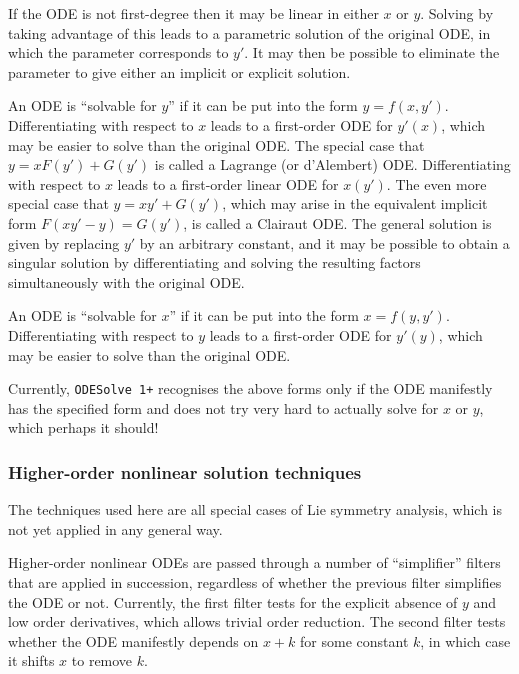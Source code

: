 \documentclass[a4paper]{article} %
\newcommand{\ODESolve}[1]{\texttt{ODESolve\,#1}}
\begin{document}
If the ODE is not first-degree then it may be linear in either $x$ or
$y$.  Solving by taking advantage of this leads to a parametric
solution of the original ODE, in which the parameter corresponds to
$y'$.  It may then be possible to eliminate the parameter to give
either an implicit or explicit solution.

An ODE is ``solvable for $y$'' if it can be put into the form $y =
f(x,y')$.  Differentiating with respect to $x$ leads to a first-order
ODE for $y'(x)$, which may be easier to solve than the original ODE.
The special case that $y = xF(y') + G(y')$ is called a Lagrange (or
d'Alembert) ODE\@.  Differentiating with respect to $x$ leads to a
first-order linear ODE for $x(y')$.  The even more special case that
$y = x y' + G(y')$, which may arise in the equivalent implicit form
$F(xy'-y) = G(y')$, is called a Clairaut ODE\@.  The general solution is
given by replacing $y'$ by an arbitrary constant, and it may be
possible to obtain a singular solution by differentiating and solving
the resulting factors simultaneously with the original ODE.

An ODE is ``solvable for $x$'' if it can be put into the form $x =
f(y,y')$.  Differentiating with respect to $y$ leads to a first-order
ODE for $y'(y)$, which may be easier to solve than the original ODE.

Currently, \ODESolve{1+} recognises the above forms only if the ODE
manifestly has the specified form and does not try very hard to
actually solve for $x$ or $y$, which perhaps it should!


\subsubsection{Higher-order nonlinear solution techniques}

The techniques used here are all special cases of Lie symmetry
analysis, which is not yet applied in any general way.

Higher-order nonlinear ODEs are passed through a number of
``simplifier'' filters that are applied in succession, regardless of
whether the previous filter simplifies the ODE or not.  Currently, the
first filter tests for the explicit absence of $y$ and low order
derivatives, which allows trivial order reduction.  The second filter
tests whether the ODE manifestly depends on $x+k$ for some constant
$k$, in which case it shifts $x$ to remove $k$.
\end{document}
